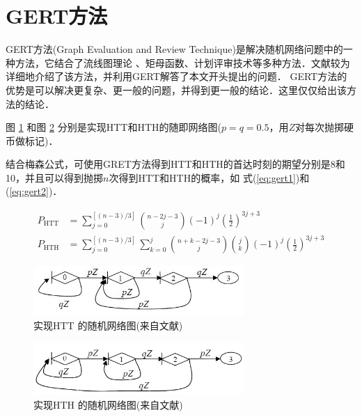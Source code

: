 \documentclass{article}
\begin{document}
\section{GERT方法}
GERT方法(Graph Evaluation and Review Technique)是解决随机网络问题中的一种方法，它结合了流线图理论
、矩母函数、计划评审技术等多种方法．文献\cite{2}较为详细地介绍了该方法，并利用GERT解答了本文开头提出的问题．
GERT方法的优势是可以解决更复杂、更一般的问题，并得到更一般的结论．这里仅仅给出该方法的结论．

图 \ref{fig:htt} 和图 \ref{fig:hth} 分别是实现HTT和HTH的随即网络图($p=q=0.5$，用$Z$对每次抛掷硬币做标记)．


结合梅森公式，可使用GRET方法得到HTT和HTH的首达时刻的期望分别是8和10，并且可以得到抛掷$n$次得到HTT和HTH的概率，如
式(\ref{eq:gert1})和(\ref{eq:gert2})．

\begin{align}
\label{eq:gert1}
P_\text{HTT}& = \sum_{j=0}^{[(n-3)/3]} {n-2j-3 \choose j}(-1)^j (\frac{1}{2})^{3j+3}\\
\label{eq:gert2}
P_\text{HTH}& = \sum_{j=0}^{[(n-3)/3]} \sum_{k=0}^j {n+k-2j-3\choose j} {j \choose k} (-1)^j(\frac{1}{2})^{3j+3}
\end{align}


\begin{figure}[h]
\centering
\includegraphics[width=8cm]{HTT}
\caption{实现HTT 的随机网络图(来自文献\cite{2})}\label{fig:htt}
\end{figure}

\begin{figure}[h]
\centering
\includegraphics[width=8cm]{HTH}
\caption{实现HTH 的随机网络图(来自文献\cite{2})}\label{fig:hth}
\end{figure}
\end{document}
